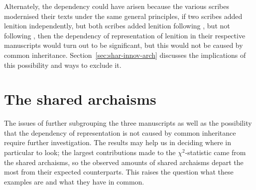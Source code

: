 Alternately, the dependency could have arisen because the various scribes modernised their texts under the same general principles, \eg if two scribes added lenition independently, but both scribes added lenition following , but not following , then the dependency of representation of lenition in their respective manuscripts would turn out to be significant, but this would not be caused by common inheritance. Section~\ref{sec:shar-innov-arch} discusses the implications of this possibility and ways to exclude it. 

\section{The shared archaisms}
\label{sec:beyond-stat-again}

The issues  of further subgrouping the three manuscripts as well as the  possibility that the dependency of representation is not caused by common inheritance require further investigation. The results may help us in deciding where in particular to look; the largest contributions made to the \(\chi^2\)-statistic came from the shared archaisms, so the observed amounts of shared archaisms depart the most from their expected counterparts. This raises the question what these examples are and what they have in common. 



